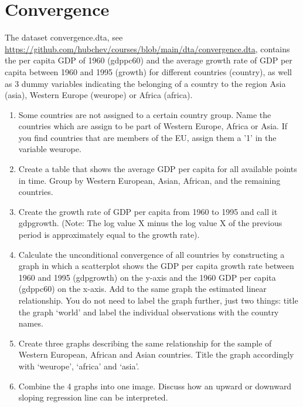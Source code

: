 



\section{Convergence}\label{sec:convergence}

The dataset convergence.dta, see  \url{https://github.com/hubchev/courses/blob/main/dta/convergence.dta}, contains the per capita GDP of 1960 (gdppc60) and the average growth rate of GDP per capita between 1960 and 1995 (growth) for different countries (country), as well as 3 dummy variables indicating the belonging of a country to the region Asia (asia), Western Europe (weurope) or Africa (africa). 

\begin{enumerate}[1)]
	\item Some countries are not assigned to a certain country group. Name the countries which are assign to be part of Western Europe, Africa or Asia.
	If you find countries that are members of the EU, assign them a '1' in the variable weurope.
	\item Create a table that shows the average GDP per capita for all available points in time. Group by Western European, Asian, African, and the remaining countries.
	\item Create the growth rate of GDP per capita from 1960 to 1995 and call it gdpgrowth. (Note: The log value X minus the log value X of the previous period is approximately equal to the growth rate).
	\item Calculate the unconditional convergence of all countries by constructing a graph in which a scatterplot shows the GDP per capita growth rate between 1960 and 1995 (gdpgrowth) on the y-axis and the 1960 GDP per capita (gdppc60) on the x-axis. Add to the same graph the estimated linear relationship. You do not need to label the graph further, just two things: title the graph `world' and label the individual observations with the country names.
	\item Create three graphs describing the same relationship for the sample of Western European, African and Asian countries. Title the graph accordingly with `weurope', `africa' and `asia'. 
	\item Combine the 4 graphs into one image. Discuss how an upward or downward sloping regression line can be interpreted.


\end{enumerate}
